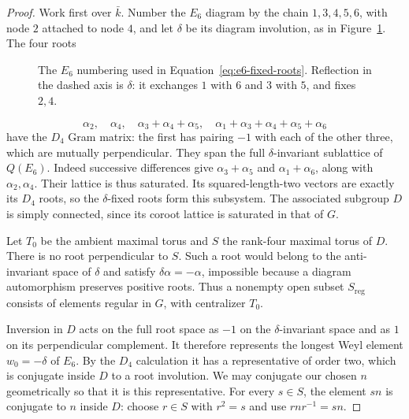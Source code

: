 \begin{proof}
Work first over $\bar k$.  Number the $E_6$ diagram by the chain
$1,3,4,5,6$, with node $2$ attached to node $4$, and let $\delta$ be its
diagram involution, as in Figure~\ref{fig:e6-diagram}.  The four roots
\begin{figure}[tbp]
\centering
{}
\caption{The $E_6$ numbering used in
Equation~\eqref{eq:e6-fixed-roots}.  Reflection in the dashed axis is
$\delta$: it exchanges $1$ with $6$ and $3$ with $5$, and fixes $2,4$.}
\label{fig:e6-diagram}
\end{figure}
\begin{equation}\label{eq:e6-fixed-roots}
 \alpha_2,\quad \alpha_4,\quad
 \alpha_3+\alpha_4+\alpha_5,\quad
 \alpha_1+\alpha_3+\alpha_4+\alpha_5+\alpha_6
\end{equation}
have the $D_4$ Gram matrix: the first has pairing $-1$ with each of the
other three, which are mutually perpendicular.  They span the full
$\delta$-invariant sublattice of $Q(E_6)$.  Indeed successive differences
give $\alpha_3+\alpha_5$ and $\alpha_1+\alpha_6$, along with
$\alpha_2,\alpha_4$.  Their lattice is thus saturated.  Its
squared-length-two vectors are exactly its $D_4$ roots, so the
$\delta$-fixed roots form this subsystem.  The associated subgroup $D$
is simply connected, since its coroot lattice is saturated in that of
$G$.

Let $T_0$ be the ambient maximal torus and $S$ the rank-four maximal
torus of $D$.  There is no root perpendicular to $S$.  Such a root
would belong to the anti-invariant space of $\delta$ and satisfy
$\delta\alpha=-\alpha$, impossible because a diagram automorphism
preserves positive roots.  Thus a nonempty open subset $S_{\mathrm{reg}}$
consists of elements regular in $G$, with centralizer $T_0$.

Inversion in $D$ acts on the full root space as $-1$ on the
$\delta$-invariant space and as $1$ on its perpendicular complement.
It therefore represents the longest Weyl element $w_0=-\delta$ of
$E_6$.  By the $D_4$ calculation it has a representative of order two,
which is conjugate inside $D$ to a root involution.  We may conjugate our
chosen $n$ geometrically so that it is this representative.  For every
$s\in S$, the element $sn$ is conjugate to $n$ inside $D$: choose
$r\in S$ with $r^2=s$ and use $rnr^{-1}=sn$.


\end{proof}
